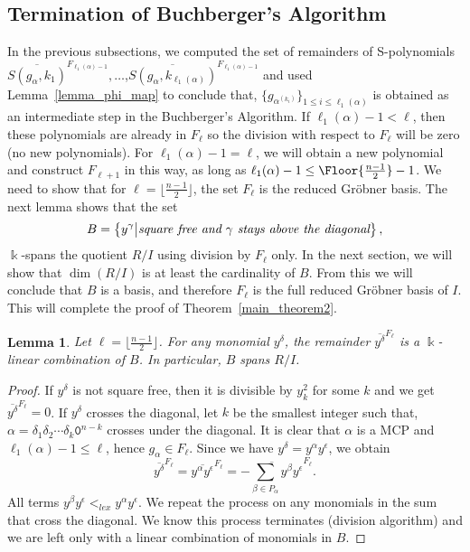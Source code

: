 \documentclass[10pt,a4paper]{article}
\newtheorem{lemma}{Lemma}[section]
\def\field{\Bbbk}
\DeclarePairedDelimiter\Floor\lfloor\rfloor
\begin{document}
\subsection{\label{property_c}Termination of Buchberger's Algorithm}
In the previous subsections, we computed the set of remainders  of S-polynomials $\overline{S(g_\alpha, k_1)}^{F_{\ell_1(\alpha)-1}}, \dots$,\break $\overline{S(g_\alpha, k_{\ell_1(\alpha)})}^{F_{\ell_1(\alpha)-1}}$ and used Lemma~\ref{lemma_phi_map} to conclude that, $\{g_{\alpha^{(k_i)}}\}_{1\le i\le \ell_1(\alpha)}$ is obtained as an intermediate step in the Buchberger's Algorithm. If $\ell_1(\alpha)-1<\ell$, then these polynomials are already in $F_\ell$ so the division with respect to $F_\ell$ will be zero (no new polynomials). For $\ell_1(\alpha)-1=\ell$, we will obtain a new polynomial and construct $F_{\ell+1}$ in this way, as long as $\ell_1(\alpha)-1 \le \Floor{\frac{n-1}{2}}-1$.
We need to show that for $\ell = \lfloor \frac{n-1}{2} \rfloor$, the set $F_\ell$ is the reduced Gr\"obner basis.
The next lemma shows that the set
\begin{equation} \label{Eq:basis1}
	B=\big\{ y^\gamma\big| \text{\it square free and $\gamma$ stays above the diagonal}\big\}\,,
\end{equation}
$\field$-spans the quotient $R/I$ using division by $F_\ell$ only. In the next section, we will show that $\dim(R/I)$ is at least the cardinality of $B$.
From this we will conclude that $B$ is a basis, and therefore $F_\ell$ is the full reduced Gr\"obner basis of $I$. This will complete the proof of Theorem~\ref{main_theorem2}.

\begin{lemma}
	    \label{lem:Bspan}
	    Let $\ell= \lfloor \frac{n-1}{2} \rfloor$. For any monomial $y^\delta$, the remainder $\overline{y^\delta}^{F_\ell}$ is a $\field$-linear combination of $B$. In particular, $B$ spans $R/I$.
    \end{lemma} 

\begin{proof}
If $y^\delta$ is not square free, then it is divisible by $y_k^2$ for some $k$ and we get $\overline{y^\delta}^{F_\ell}=0$. 
If $y^\delta$ crosses the diagonal, 
let $k$ be the smallest integer such that, $\alpha=\delta_1\delta_2\cdots\delta_k \texttt{0}^{n-k}$ 
crosses under the diagonal. It is clear that $\alpha$ is a MCP and $\ell_1(\alpha)-1\le \ell$, hence $g_\alpha\in F_\ell$. Since we have $y^\delta=y^\alpha y^\epsilon$, we obtain
\begin{equation}\label{eq:contra}
	\overline{y^\delta}^{F_\ell}=\overline{y^\alpha y^\epsilon}^{F_\ell}=\overline{-\sum_{\beta\in P_\alpha}y^\beta y^\epsilon}^{F_\ell}.
\end{equation}
All terms $y^\beta y^\epsilon<_{lex} y^\alpha y^\epsilon$. We repeat the process on any monomials in the sum that cross the diagonal. 
We know this process terminates (division algorithm) and we are left only with a linear combination of monomials in $B$.
\end{proof}
\end{document}
